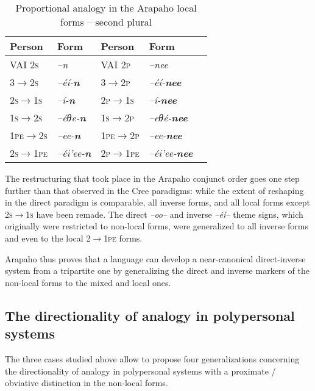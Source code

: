 \documentclass[twoside,a4paper,11pt]{article}
\newcommand{\ipa}[1]{{\phon\textit{#1}}}
\newcommand{\grise}[1]{\cellcolor{lightgray}\textbf{#1}}
\newcommand{\Σ}{\greek{Σ}}
\begin{document}
 
 \begin{table}[H]
\caption{Proportional analogy in the Arapaho local forms -- second plural}
\centering \label{tab:arapaho.analogy.local2}
\begin{tabular}{lllll}
\toprule
 Person &  Form &  Person &  Form\\
\midrule 
 VAI \textsc{2s} & \ipa{--n} &  VAI \textsc{2p} & \ipa{--nee} \\
  \textsc{3$\rightarrow$2s} & \ipa{--éí-\textbf{n}} &   \textsc{3$\rightarrow$2p} & \ipa{--éí-\textbf{nee}} \\
\textsc{2s$\rightarrow$1s}&  \ipa{--í-\textbf{n}} & \textsc{2p$\rightarrow$1s}&  \ipa{--í-\textbf{nee}} \\
   \midrule 
    \textsc{1s$\rightarrow$2s}& \ipa{--éθe-\textbf{n}} & \textsc{1s$\rightarrow$2p}&\ipa{--eθé-\textbf{nee}} \grise{} \\
    \textsc{1pe$\rightarrow$2s}&\ipa{--ee-\textbf{n}} & \textsc{1pe$\rightarrow$2p}&\ipa{--ee-\textbf{nee}}\grise{} \\
    \textsc{2s$\rightarrow$1pe}& \ipa{--éi'ee-\textbf{n}}&\textsc{2p$\rightarrow$1pe}&\ipa{--éi'ee-\textbf{nee}}\grise{}\\
\bottomrule
\end{tabular}
\end{table}
 
The restructuring that took place in the Arapaho conjunct order goes one step further than that observed in the Cree paradigms: while the extent of reshaping in the direct paradigm is comparable, all inverse forms, and   all local forms except \textsc{2s$\rightarrow$1s} have been remade. The direct \ipa{--oo--} and inverse \ipa{--éí--} theme signs, which originally were restricted to non-local forms, were generalized to all inverse forms and even to the local \textsc{2$\rightarrow$1pe} forms.

Arapaho thus proves that a language can develop a near-canonical direct-inverse system from a tripartite one by generalizing the direct and inverse markers of the non-local forms to the mixed and local ones. 

\subsection{The directionality of analogy in polypersonal systems}

The three cases studied above allow to propose four generalizations concerning the directionality of analogy in polypersonal systems with a proximate / obviative distinction in the non-local forms.
 
\end{document}
